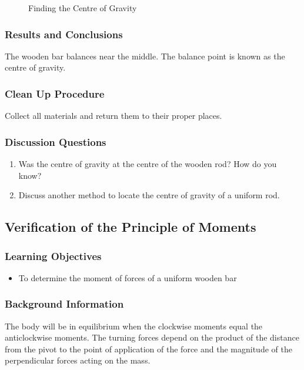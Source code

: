 \begin{figure}
\begin{center}
\def\svgwidth{200pt}

\caption{Finding the Centre of Gravity}
\label{fig:center-of-gravity}
\end{center}
\end{figure}

\subsubsection*{Results and Conclusions}
The wooden bar balances near the middle. The balance point is known as the centre of gravity.  

\subsubsection*{Clean Up Procedure}
Collect all materials and return them to their proper places.

\subsubsection*{Discussion Questions}
\begin{enumerate}
\item{Was the centre of gravity at the centre of the wooden rod? How do you know?}
\item{Discuss another method to locate the centre of gravity of a uniform rod.} 
\end{enumerate}

\subsection{Verification of the Principle of Moments}

\subsubsection*{Learning Objectives}
\begin{itemize}
\item{To determine the moment of forces of a uniform wooden bar}
\end{itemize}

\subsubsection*{Background Information}
The body will be in equilibrium when the clockwise moments equal the anticlockwise moments. The turning forces depend on the product of the distance from the pivot to the point of application of the force and the magnitude of the perpendicular forces acting on the mass.  

